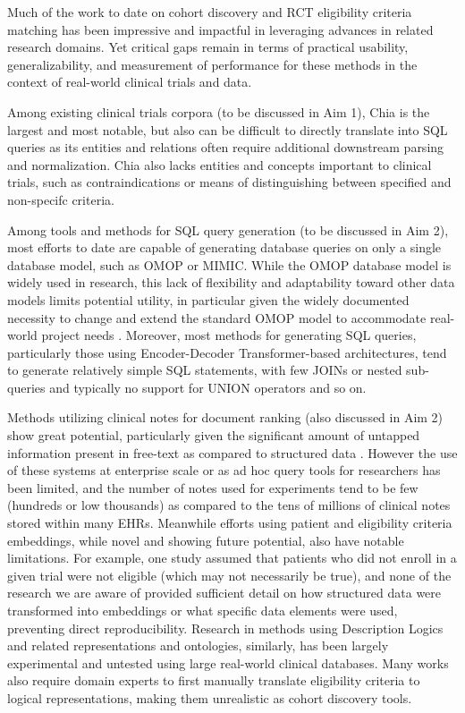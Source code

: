 \documentclass[../main.tex]{subfiles}
\begin{document}
Much of the work to date on cohort discovery and RCT eligibility criteria matching has been impressive and impactful in leveraging advances in related research domains. Yet critical gaps remain in terms of practical usability, generalizability, and measurement of performance for these methods in the context of real-world clinical trials and data. 

Among existing clinical trials corpora (to be discussed in Aim 1), Chia is the largest and most notable, but also can be difficult to directly translate into SQL queries as its entities and relations often require additional downstream parsing and normalization. Chia also lacks entities and concepts important to clinical trials, such as contraindications or means of distinguishing between specified and non-specifc criteria. 

Among tools and methods for SQL query generation (to be discussed in Aim 2), most efforts to date are capable of generating database queries on only a single database model, such as OMOP or MIMIC. While the OMOP database model is widely used in research, this lack of flexibility and adaptability toward other data models limits potential utility, in particular given the widely documented necessity to change and extend the standard OMOP model to accommodate real-world project needs \cite{belenkaya2021extending, peng2021towards, zoch2021adaption, warner2019hemonc, zhou2013evaluation, shin2019genomic, kwon2019development}. Moreover, most methods for generating SQL queries, particularly those using Encoder-Decoder Transformer-based architectures, tend to generate relatively simple SQL statements, with few JOINs or nested sub-queries and typically no support for UNION operators and so on.

Methods utilizing clinical notes for document ranking (also discussed in Aim 2) show great potential, particularly given the significant amount of untapped information present in free-text as compared to structured data \cite{warrer2012using}. However the use of these systems at enterprise scale or as ad hoc query tools for researchers has been limited, and the number of notes used for experiments tend to be few (hundreds or low thousands) as compared to the tens of millions of clinical notes stored within many EHRs. Meanwhile efforts using patient and eligibility criteria embeddings, while novel and showing future potential, also have notable limitations. For example, one study assumed that patients who did not enroll in a given trial were not eligible \cite{zhang2020deepenroll} (which may not necessarily be true), and none of the research we are aware of provided sufficient detail on how structured data were transformed into embeddings or what specific data elements were used, preventing direct reproducibility. Research in methods using Description Logics and related representations and ontologies, similarly, has been largely experimental and untested using large real-world clinical databases. Many works also require domain experts to first manually translate eligibility criteria to logical representations, making them unrealistic as cohort discovery tools. 
\end{document}
